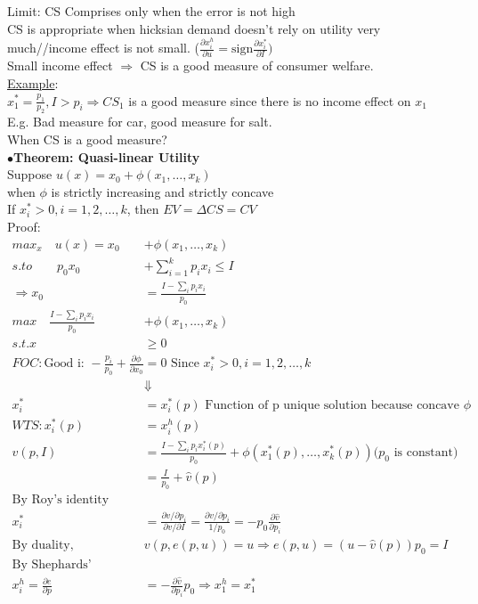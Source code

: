 \documentclass[letterpaper,13pt,single,pdftex]{scrartcl}
\begin{document}
Limit: CS Comprises only when the error is not high \\
CS is appropriate when hicksian demand doesn't rely on utility very much//income effect is not small. ($\frac{\partial x_i^h }{\partial u} = \text{sign} \frac{\partial x_i^*}{\partial I})$\\
Small income effect $\Rightarrow$ CS is a good measure of consumer welfare. \\

\underline{Example}:\\
$x_1^*=\frac{p_1}{p_2}, I > p_i \Rightarrow CS_1$ is a good measure since there is no income effect on $x_1$\\
E.g. Bad measure for car, good measure for salt.\\

When CS is a good measure?\\
$\bullet$\textbf{Theorem: Quasi-linear Utility}\\
 Suppose $u(x) = x_0 + \phi(x_1,\dots,x_k)$ \\ when $\phi$ is strictly increasing and strictly concave\\ If $x_i^*>0, i=1, 2,\dots,k$, then $EV=\Delta CS = CV$\\
Proof: \begin{align*}
    max_x \quad u(x) = x_0 &+ \phi(x_1,\dots,x_k)\\
    s.to \qquad p_0x_0 &+ \sum\limits_{i=1}^{k}p_ix_i \le I\\
    \Rightarrow x_0 &= \frac{I - \sum\limits_{i} p_ix_i}{p_0}\\
    max \quad \frac{I - \sum\limits_{i} p_ix_i}{p_0} &+ \phi(x_1,\dots, x_k)\\
    s.t. x&\ge 0\\
    FOC: \text{Good i: } -\frac{p_i}{p_0}+\frac{\partial \phi}{\partial x_0} &= 0 \text{  Since } x_i^* >0, i= 1,2,\dots, k\\
    &\Downarrow\\
    x_i^* &= x_i^*(p) \text{ Function of p unique solution because concave }\phi\\ 
    WTS:  x_i^*(p) &= x_i^h(p)\\
    v(p,I) &= \frac{I - \sum\limits_{i}p_ix_i^*(p)}{p_0} + \phi(x_1^*(p), \dots, x_k^*(p)) (p_0\text{ is constant)}\\
    &= \frac{I}{p_0} + \hat{v}(p) \\
    \text{By Roy's identity}\\
    x_i^* &= \frac{\partial v/\partial p_i}{\partial v/\partial I} =  \frac{\partial v/\partial p_i}{1 / p_0} = -p_0\frac{\partial \hat{v}}{\partial p_i}\\
    \text{By duality, } &v(p,e(p,u)) = u \Rightarrow e(p,u) = (u-\hat{v}(p)) p_0 = I\\
    \text{By Shephards' Lemma }\\
    x_i^h = \frac{\partial e}{\partial p} &= -\frac{\partial \hat{v}}{\partial p_i}p_0 \Rightarrow x_1^h = x_1^*
\end{align*}
\newpage
\end{document}
